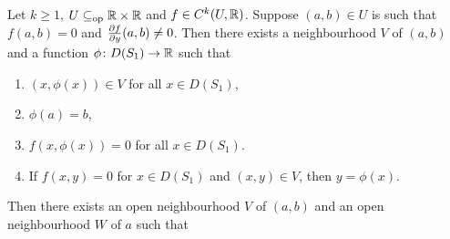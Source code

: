 \begin{theorem} \label{thm:imft}
    Let $k \ge 1$, $U \subseteq_{\mathrm{op}} \mathbb{R} \times \mathbb{R}$ and $f \in C^k(U, \mathbb{R})$.
    Suppose $(a, b) \in U$ is such that $f(a, b) = 0$ and
    $\pdv{f}{y}(a, b) \ne 0$.
    Then there exists a neighbourhood $V$ of $(a, b)$ and a function
    $\phi\colon D(S_1) \to \mathbb{R}$ such that
    \begin{enumerate}
        \item $(x, \phi(x)) \in V$ for all $x \in D(S_1)$,
        \item $\phi(a) = b$,
        \item $f(x, \phi(x)) = 0$ for all $x \in D(S_1)$.
        \item If $f(x, y) = 0$ for $x \in D(S_1)$ and $(x, y) \in V$,
            then $y = \phi(x)$.
    \end{enumerate}
    Then there exists an open neighbourhood $V$ of $(a, b)$ and an open
    neighbourhood $W$ of $a$ such that
\end{theorem}
